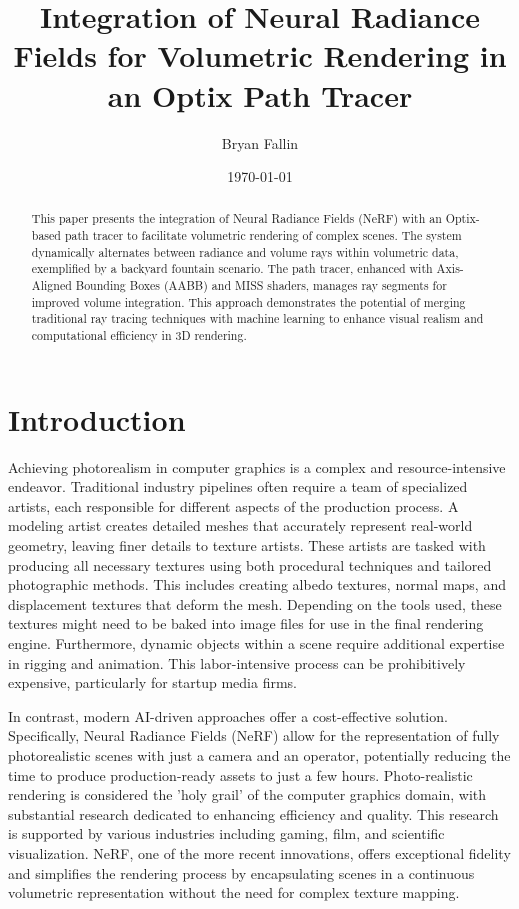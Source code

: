 \documentclass[conference]{IEEEtran}
\title{Integration of Neural Radiance Fields for Volumetric Rendering in an Optix Path Tracer}
\author{Bryan Fallin}
\date{\today}
\begin{document}
\maketitle

\begin{abstract}
This paper presents the integration of Neural Radiance Fields (NeRF) with an Optix-based path tracer to facilitate volumetric rendering of complex scenes. The system dynamically alternates between radiance and volume rays within volumetric data, exemplified by a backyard fountain scenario. The path tracer, enhanced with Axis-Aligned Bounding Boxes (AABB) and MISS shaders, manages ray segments for improved volume integration. This approach demonstrates the potential of merging traditional ray tracing techniques with machine learning to enhance visual realism and computational efficiency in 3D rendering.
\end{abstract}

\section{Introduction}

Achieving photorealism in computer graphics is a complex and resource-intensive endeavor. Traditional industry pipelines often require a team of specialized artists, each responsible for different aspects of the production process. A modeling artist creates detailed meshes that accurately represent real-world geometry, leaving finer details to texture artists. These artists are tasked with producing all necessary textures using both procedural techniques and tailored photographic methods. This includes creating albedo textures, normal maps, and displacement textures that deform the mesh. Depending on the tools used, these textures might need to be baked into image files for use in the final rendering engine. Furthermore, dynamic objects within a scene require additional expertise in rigging and animation. This labor-intensive process can be prohibitively expensive, particularly for startup media firms.

In contrast, modern AI-driven approaches offer a cost-effective solution. Specifically, Neural Radiance Fields (NeRF) allow for the representation of fully photorealistic scenes with just a camera and an operator, potentially reducing the time to produce production-ready assets to just a few hours. Photo-realistic rendering is considered the 'holy grail' of the computer graphics domain, with substantial research dedicated to enhancing efficiency and quality. This research is supported by various industries including gaming, film, and scientific visualization. NeRF, one of the more recent innovations, offers exceptional fidelity and simplifies the rendering process by encapsulating scenes in a continuous volumetric representation without the need for complex texture mapping\cite{mildenHallOGNerf, gao2023nerf}.
\end{document}
